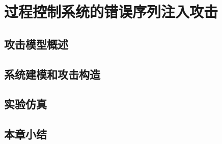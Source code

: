 
\chapter{过程控制系统的错误序列注入攻击}
\label{chap:FSIattack}

\section{攻击模型概述}
\label{sec:list}



\section{系统建模和攻击构造}
\label{sec:matheq}


\section{实验仿真}
\label{sec:insertimage}

\section{本章小结}
\label{sec:insertimage}

